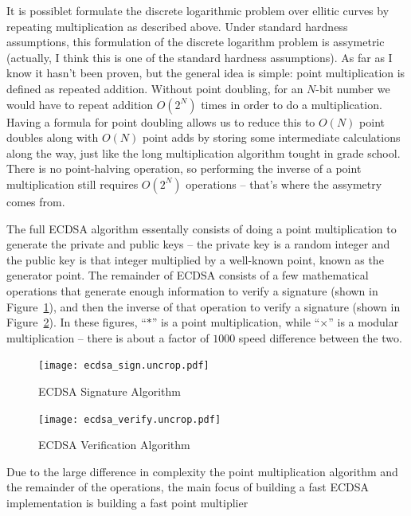 \documentclass[twocolumn]{article}
\begin{document}
It is possiblet formulate the discrete logarithmic problem over
ellitic curves by repeating multiplication as described above.  Under
standard hardness assumptions, this formulation of the discrete
logarithm problem is assymetric (actually, I think this is one of the
standard hardness assumptions).  As far as I know it hasn't been
proven, but the general idea is simple: point multiplication is
defined as repeated addition.  Without point doubling, for an $N$-bit
number we would have to repeat addition $O(2^N)$ times in order to do
a multiplication.  Having a formula for point doubling allows us to
reduce this to $O(N)$ point doubles along with $O(N)$ point adds by
storing some intermediate calculations along the way, just like the
long multiplication algorithm tought in grade school.  There is no
point-halving operation, so performing the inverse of a point
multiplication still requires $O(2^N)$ operations -- that's where the
assymetry comes from.

The full ECDSA algorithm essentally consists of doing a point
multiplication to generate the private and public keys -- the private
key is a random integer and the public key is that integer multiplied
by a well-known point, known as the generator point.  The remainder of
ECDSA consists of a few mathematical operations that generate enough
information to verify a signature (shown in Figure~\ref{ecdsa-sign}),
and then the inverse of that operation to verify a signature (shown in
Figure~\ref{ecdsa-verify}).  In these figures, ``$*$'' is a point
multiplication, while ``$\times$'' is a modular multiplication --
there is about a factor of $1000$ speed difference between the two.

\begin{figure}[ht]
  \begin{center}
    \texttt{[image: ecdsa\_sign.uncrop.pdf]}
  \end{center}

  \caption{ECDSA Signature Algorithm
    \label{ecdsa-sign}}
\end{figure}

\begin{figure}[ht]
  \begin{center}
    \texttt{[image: ecdsa\_verify.uncrop.pdf]}
  \end{center}

  \caption{ECDSA Verification Algorithm
    \label{ecdsa-verify}}
\end{figure}

Due to the large difference in complexity the point multiplication
algorithm and the remainder of the operations, the main focus of
building a fast ECDSA implementation is building a fast point multiplier
\end{document}
